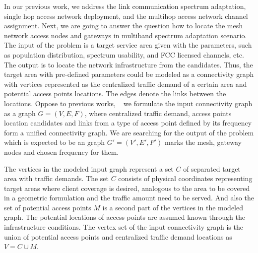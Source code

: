 

In our previous work, we address the link communication spectrum adaptation, 
single hop access network deployment, and the multihop access network channel
assignment. Next, we are going to answer the question how to locate the mesh
network access nodes and gateways in multiband spectrum adaptation scenario.
The input of the problem is a target service area given with the parameters, 
such as population distribution, spectrum usability, and FCC licensed channels, 
etc. The output is to locate the network infrastructure from the candidates.
Thus, the target area with pre-defined parameters could be modeled as a 
connectivity graph with vertices represented as the centralized traffic demand 
of a certain area and potential access points locations. The edges denote the 
links between the locations. Oppose to previous works,
~\cite{robinson2010deploying,franklin2007node,tang2005interference,irwin2013resource}
we formulate the input connectivity graph as a graph $G = (V,E,F)$, where centralized
traffic demand, access points location candidates and links from a type of access 
point defined by its frequency form a unified connectivity graph. 
We are searching for the output of the problem which is expected to be an graph 
$G' = (V',E',F')$ marks the mesh, gateway nodes and chosen frequency for them. 

The vertices in the modeled input graph represent a set $C$ of  separated target 
area with traffic demands. The set $C$ consists of physical coordinates representing 
target areas where client coverage is desired, analogous to the area to be covered 
in a geometric formulation and the traffic amount need to be served. And also the 
set of potential access points $M$ is a second part of the vertices in the modeled 
graph. The potential locations of access points are assumed known through the 
infrastructure conditions. The vertex set of the input connectivity graph is 
the union of potential access points and centralized traffic demand locations as 
$V = C\cup M$.

